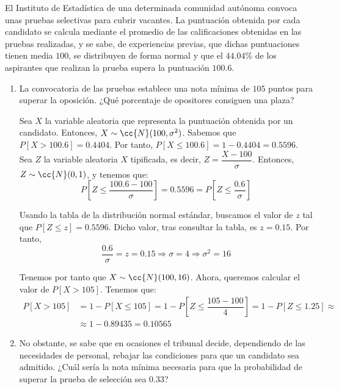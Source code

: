 \begin{ejercicio}
    El Instituto de Estadística de una determinada comunidad autónoma convoca unas pruebas selectivas para cubrir vacantes. La puntuación obtenida por cada candidato se calcula mediante el promedio de las calificaciones obtenidas en las pruebas realizadas, y se sabe, de experiencias previas, que dichas puntuaciones tienen media $100$, se distribuyen de forma normal y que el $44.04\%$ de los aspirantes que realizan la prueba supera la puntuación $100.6$.
    \begin{enumerate}
        \item La convocatoria de las pruebas establece una nota mínima de $105$ puntos para superar la oposición. ¿Qué porcentaje de opositores consiguen una plaza?
        
        Sea $X$ la variable aleatoria que representa la puntuación obtenida por un candidato. Entonces, $X\sim \cc{N}(100,\sigma^2)$. Sabemos que $P[X>100.6] = 0.4404$. Por tanto, $P[X\leq 100.6] = 1-0.4404 = 0.5596$.
        Sea $Z$ la variable aleatoria $X$ tipificada, es decir, $Z = \dfrac{X-100}{\sigma}$. Entonces, $Z\sim \cc{N}(0,1)$, y tenemos que:
        \begin{equation*}
            P\left[Z\leq \dfrac{100.6-100}{\sigma}\right] = 0.5596 = P\left[Z\leq \dfrac{0.6}{\sigma}\right]
        \end{equation*}

        Usando la tabla de la distribución normal estándar, buscamos el valor de $z$ tal que $P[Z\leq z] = 0.5596$. Dicho valor, tras consultar la tabla, es $z = 0.15$. Por tanto,
        \begin{equation*}
            \dfrac{0.6}{\sigma} = z = 0.15 \Longrightarrow \sigma = 4 \Longrightarrow \sigma^2 = 16
        \end{equation*}

        Tenemos por tanto que $X\sim \cc{N}(100,16)$. Ahora, queremos calcular el valor de $P[X>105]$. Tenemos que:
        \begin{align*}
            P[X>105] &= 1-P[X\leq 105] = 1-P\left[Z\leq \dfrac{105-100}{4}\right] = 1-P\left[Z\leq 1.25\right] \approx\\&\approx 1-0.89435 = 0.10565
        \end{align*}



        \item No obstante, se sabe que en ocasiones el tribunal decide, dependiendo de las necesidades de personal, rebajar las condiciones para que un candidato sea admitido. ¿Cuál sería la nota mínima necesaria para que la probabilidad de superar la prueba de selección sea $0.33$?
        

\end{enumerate}
\end{ejercicio}
